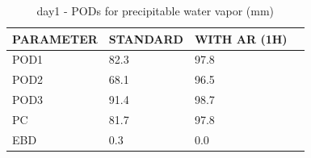 \begin{table}[p!]
\begin{center}
\begin{tabular}{|l|l|l|l|}
\hline
\multicolumn{1}{|c|}{\cellcolor[HTML]{C0C0C0}\textbf{PARAMETER}} & \multicolumn{1}{c|}{\cellcolor[HTML]{C0C0C0}\textbf{STANDARD}} & \multicolumn{1}{c|}{\cellcolor[HTML]{C0C0C0}\textbf{WITH AR (1H)}} \\
\hline
\cellcolor[HTML]{C0C0C0}POD1  & 82.3                                & 97.8         \\
\cellcolor[HTML]{C0C0C0}POD2  & 68.1                                & 96.5         \\
\cellcolor[HTML]{C0C0C0}POD3  & 91.4                                & 98.7         \\
\cellcolor[HTML]{C0C0C0}PC    & 81.7                                  & 97.8           \\
\cellcolor[HTML]{C0C0C0}EBD   & 0.3                                 & 0.0          \\
\hline
\end{tabular}
\caption{day1 - PODs for precipitable water vapor (mm)}
\label{tab:podpwv:day1}
\end{center}
\end{table}

